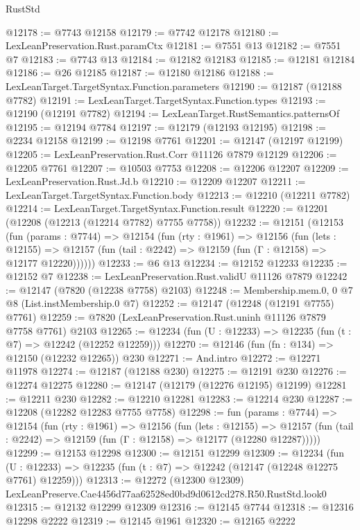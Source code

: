 \begin{lexlean}{RustStd}
\begin{coremodule}
@12178 := @7743 @12158
@12179 := @7742 @12178
@12180 := LexLeanPreservation.Rust.paramCtx
@12181 := @7551 @13
@12182 := @7551 @7
@12183 := @7743 @13
@12184 := @12182 @12183
@12185 := @12181 @12184
@12186 := @26 @12185
@12187 := @12180 @12186
@12188 := LexLeanTarget.TargetSyntax.Function.parameters
@12190 := @12187 (@12188 @7782)
@12191 := LexLeanTarget.TargetSyntax.Function.types
@12193 := @12190 (@12191 @7782)
@12194 := LexLeanTarget.RustSemantics.patternsOf
@12195 := @12194 @7784
@12197 := @12179 (@12193 @12195)
@12198 := @2234 @12158
@12199 := @12198 @7761
@12201 := @12147 (@12197 @12199)
@12205 := LexLeanPreservation.Rust.Corr @11126 @7879 @12129
@12206 := @12205 @7761
@12207 := @10503 @7753
@12208 := @12206 @12207
@12209 := LexLeanPreservation.Rust.Jd.b
@12210 := @12209 @12207
@12211 := LexLeanTarget.TargetSyntax.Function.body
@12213 := @12210 (@12211 @7782)
@12214 := LexLeanTarget.TargetSyntax.Function.result
@12220 := @12201 (@12208 (@12213 (@12214 @7782) @7755 @7758))
@12232 := @12151
    (@12153
      (fun (params : @7744) =>
      @12154
        (fun (rty : @1961) =>
        @12156
          (fun (lets : @12155) =>
          @12157 (fun (tail : @2242) => @12159 (fun (Γ : @12158) => @12177 @12220))))))
@12233 := @6 @13
@12234 := @12152 @12233
@12235 := @12152 @7
@12238 := LexLeanPreservation.Rust.validU @11126 @7879
@12242 := @12147 (@7820 (@12238 @7758) @2103)
@12248 := Membership.mem.{0, 0} @7 @8 (List.instMembership.{0} @7)
@12252 := @12147 (@12248 (@12191 @7755) @7761)
@12259 := @7820 (LexLeanPreservation.Rust.uninh @11126 @7879 @7758 @7761) @2103
@12265 := @12234 (fun (U : @12233) => @12235 (fun (t : @7) => @12242 (@12252 @12259)))
@12270 := @12146 (fun (fn : @134) => @12150 (@12232 @12265)) @230
@12271 := And.intro
@12272 := @12271 @11978
@12274 := @12187 (@12188 @230)
@12275 := @12191 @230
@12276 := @12274 @12275
@12280 := @12147 (@12179 (@12276 @12195) @12199)
@12281 := @12211 @230
@12282 := @12210 @12281
@12283 := @12214 @230
@12287 := @12208 (@12282 @12283 @7755 @7758)
@12298 := fun (params : @7744) =>
  @12154
    (fun (rty : @1961) =>
    @12156
      (fun (lets : @12155) =>
      @12157 (fun (tail : @2242) => @12159 (fun (Γ : @12158) => @12177 (@12280 @12287)))))
@12299 := @12153 @12298
@12300 := @12151 @12299
@12309 := @12234
    (fun (U : @12233) => @12235 (fun (t : @7) => @12242 (@12147 (@12248 @12275 @7761) @12259)))
@12313 := @12272 (@12300 @12309) LexLeanPreserve.Cae4456d77aa62528ed0bd9d0612cd278.R50.RustStd.look0
@12315 := @12132 @12299 @12309
@12316 := @12145 @7744
@12318 := @12316 @12298 @2222
@12319 := @12145 @1961
@12320 := @12165 @2222

\end{coremodule}
\end{lexlean}
